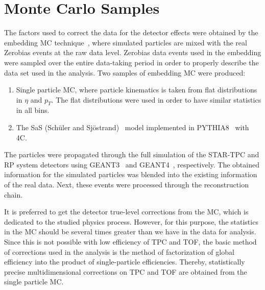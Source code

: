 \section{Monte Carlo Samples }\label{section:star_mc}
The factors used to correct the data for the detector effects were obtained by the embedding MC technique~\cite{STAR:tpc}, where  simulated particles are mixed with the real Zerobias events at the raw data level. Zerobias data events used in the embedding were sampled over the entire data-taking period in order to properly describe the data set used in the analysis.  Two samples of embedding MC were produced:
\begin{enumerate}
	\item Single particle MC, where  particle kinematics is taken from flat distributions in $\eta$ and $p_T$. The flat  distributions were used in order to have similar statistics in all bins.
	\item The SaS (Sch{\"u}ler and Sj{\"o}strand)~\cite{PYTHIA:SaS} model implemented in PYTHIA8~\cite{PYTHIA8:Intro} with 4C. 
\end{enumerate}
The particles were propagated through the full simulation of the STAR-TPC and RP system detectors using GEANT3~\cite{GEANT:three} and GEANT4~\cite{GEANT:three}, respectively. The obtained information for the simulated particles was blended into the existing information of the real data. Next, these events were processed through the  reconstruction chain. 

It is preferred to get the detector true-level corrections from the MC, which is dedicated to the studied  physics process. However, for this purpose, the statistics in the MC should be several times greater than we have in the data for analysis. Since this is not possible with  low efficiency of TPC and TOF, the basic method of corrections used in the analysis is the method of factorization of global efficiency into the product of single-particle efficiencies. Thereby, statistically precise multidimensional corrections on TPC and TOF are obtained from the single particle MC.

